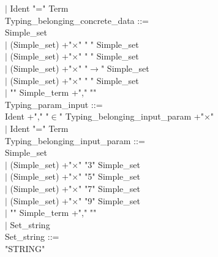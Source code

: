\documentclass[12pt,a4paper,draft]{article}
\begin{document}
{\begin{sloppypar}
\hspace*{0.20in} $|$ Ident  "="  Term\\ 
Typing\_belonging\_concrete\_data ::= \\ 
\hspace*{0.20in}   Simple\_set\\ 
\hspace*{0.20in} $|$ (Simple\_set) +"$\times$"  " "  Simple\_set  \\ 
\hspace*{0.20in} $|$ (Simple\_set) +"$\times$"   " "  Simple\_set  \\ 
\hspace*{0.20in} $|$ (Simple\_set) +"$\times$"   "$\rightarrow$"  Simple\_set  \\ 
\hspace*{0.20in} $|$ (Simple\_set) +"$\times$"   " "  Simple\_set  \\ 
\hspace*{0.20in} $|$ "{" Simple\_term +","  "}"\\ 
 Typing\_param\_input ::= \\ 
\hspace*{0.20in}  Ident +","   "$\in$"  Typing\_belonging\_input\_param +"$\times$"\\ 
\hspace*{0.20in} $|$ Ident  "="  Term\\ 
Typing\_belonging\_input\_param ::= \\ 
\hspace*{0.20in}   Simple\_set\\ 
\hspace*{0.20in} $|$ (Simple\_set)  +"$\times$"   "3"  Simple\_set  \\ 
\hspace*{0.20in} $|$ (Simple\_set)  +"$\times$"   "5"  Simple\_set\\ 
\hspace*{0.20in} $|$ (Simple\_set)  +"$\times$"   "7"  Simple\_set\\ 
\hspace*{0.20in} $|$ (Simple\_set) +"$\times$"  "9"  Simple\_set\\ 
\hspace*{0.20in} $|$ "{" Simple\_term +","  "}"\\ 
\hspace*{0.20in} $|$ Set\_string\\ 
Set\_string ::= \\ 
\hspace*{0.20in}  "STRING" \\ 

\end{sloppypar}}
\end{document}
